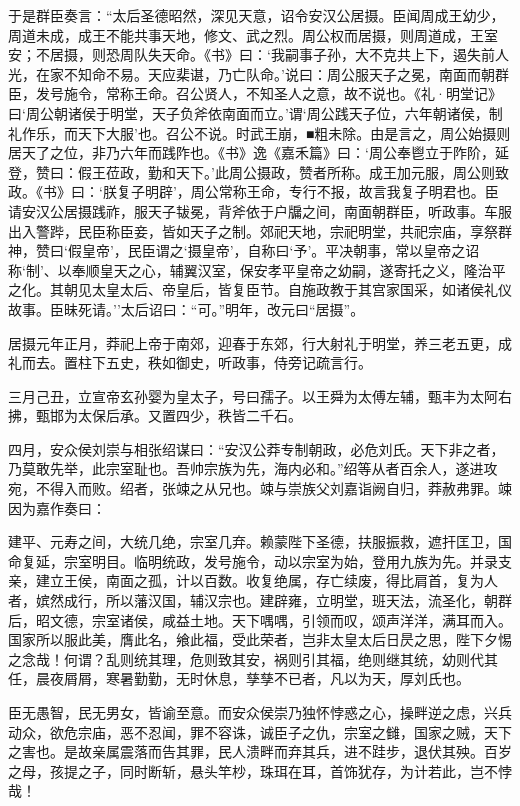 \documentclass[]{article}
\begin{document}
于是群臣奏言：``太后圣德昭然，深见天意，诏令安汉公居摄。臣闻周成王幼少，周道未成，成王不能共事天地，修文、武之烈。周公权而居摄，则周道成，王室安；不居摄，则恐周队失天命。《书》曰：`我嗣事子孙，大不克共上下，遏失前人光，在家不知命不易。天应棐谌，乃亡队命。'说曰：周公服天子之冕，南面而朝群臣，发号施令，常称王命。召公贤人，不知圣人之意，故不说也。《礼·明堂记》曰`周公朝诸侯于明堂，天子负斧依南面而立。'谓`周公践天子位，六年朝诸侯，制礼作乐，而天下大服'也。召公不说。时武王崩，■粗未除。由是言之，周公始摄则居天了之位，非乃六年而践阼也。《书》逸《嘉禾篇》曰：`周公奉鬯立于阼阶，延登，赞曰：假王莅政，勤和天下。'此周公摄政，赞者所称。成王加元服，周公则致政。《书》曰：`朕复子明辟'，周公常称王命，专行不报，故言我复子明君也。臣请安汉公居摄践祚，服天子韨冕，背斧依于户牖之间，南面朝群臣，听政事。车服出入警跸，民臣称臣妾，皆如天子之制。郊祀天地，宗祀明堂，共祀宗庙，享祭群神，赞曰`假皇帝'，民臣谓之`摄皇帝'，自称曰`予'。平决朝事，常以皇帝之诏称`制'、以奉顺皇天之心，辅翼汉室，保安孝平皇帝之幼嗣，遂寄托之义，隆治平之化。其朝见太皇太后、帝皇后，皆复臣节。自施政教于其宫家国采，如诸侯礼仪故事。臣昧死请。''太后诏曰：``可。''明年，改元曰``居摄''。

居摄元年正月，莽祀上帝于南郊，迎春于东郊，行大射礼于明堂，养三老五更，成礼而去。置柱下五史，秩如御史，听政事，侍旁记疏言行。

三月己丑，立宣帝玄孙婴为皇太子，号曰孺子。以王舜为太傅左辅，甄丰为太阿右拂，甄邯为太保后承。又置四少，秩皆二千石。

四月，安众侯刘崇与相张绍谋曰：``安汉公莽专制朝政，必危刘氏。天下非之者，乃莫敢先举，此宗室耻也。吾帅宗族为先，海内必和。''绍等从者百余人，遂进攻宛，不得入而败。绍者，张竦之从兄也。竦与崇族父刘嘉诣阙自归，莽赦弗罪。竦因为嘉作奏曰：

建平、元寿之间，大统几绝，宗室几弃。赖蒙陛下圣德，扶服振救，遮扞匡卫，国命复延，宗室明目。临明统政，发号施令，动以宗室为始，登用九族为先。并录支亲，建立王侯，南面之孤，计以百数。收复绝属，存亡续废，得比肩首，复为人者，嫔然成行，所以藩汉国，辅汉宗也。建辟雍，立明堂，班天法，流圣化，朝群后，昭文德，宗室诸侯，咸益土地。天下喁喁，引领而叹，颂声洋洋，满耳而入。国家所以服此美，膺此名，飨此福，受此荣者，岂非太皇太后日昃之思，陛下夕惕之念哉！何谓？乱则统其理，危则致其安，祸则引其福，绝则继其统，幼则代其任，晨夜屑屑，寒暑勤勤，无时休息，孳孳不已者，凡以为天，厚刘氏也。

臣无愚智，民无男女，皆谕至意。而安众侯崇乃独怀悖惑之心，操畔逆之虑，兴兵动众，欲危宗庙，恶不忍闻，罪不容诛，诚臣子之仇，宗室之雠，国家之贼，天下之害也。是故亲属震落而告其罪，民人溃畔而弃其兵，进不跬步，退伏其殃。百岁之母，孩提之子，同时断斩，悬头竿杪，珠珥在耳，首饰犹存，为计若此，岂不悖哉！
\end{document}

